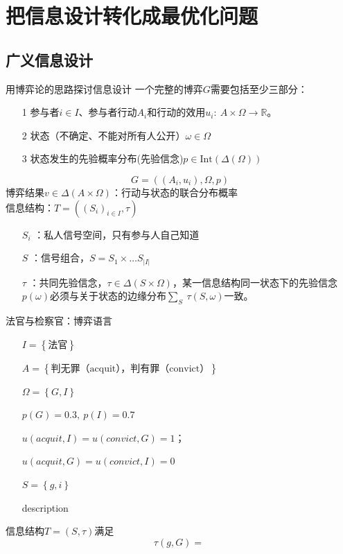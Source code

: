 \documentclass{beamer}
\begin{document}
\section{把信息设计转化成最优化问题}

\subsection{广义信息设计}

\begin{frame}{用博弈论的思路探讨信息设计}
	一个完整的博弈$G$需要包括至少三部分：
	\begin{itemize}
		\item[1] 参与者$i\in I$、参与者行动$A_{i}$和行动的效用$u_{i}: \ A\times\Omega\to\mathbb{R}$。
		\item[2] 状态（不确定、不能对所有人公开）$\omega\in\Omega$
		\item[3] 状态发生的先验概率分布(先验信念)$p\in \text{Int} \left(\Delta\left(\Omega\right)\right)$
	\end{itemize}
	$$G=\left(\left(A_{i},u_{i}\right),\Omega,p\right)$$
	博弈结果$v\in\Delta\left(A\times\Omega\right)$：行动与状态的联合分布概率\\
	信息结构：$T=\left(\left(S_{i}\right)_{i\in I},\tau\right)$
	\begin{itemize}
		\item[$S_{i}$] ：私人信号空间，只有参与人自己知道
		\item[$ S $] ：信号组合，$S=S_{1}\times\dots S_{|I|}$
		\item[$ \tau $] ：共同先验信念，$\tau \in \Delta\left(S\times\Omega\right)$，某一信息结构同一状态下的先验信念$p\left(\omega\right)$必须与关于状态的边缘分布$\sum_{S}\ \tau\left(S,\omega\right)$一致。
		
	\end{itemize}
\end{frame}

\begin{frame}{法官与检察官：博弈语言}
	\begin{itemize}
		\item[] $I=\left\lbrace \text{法官} \right\rbrace$
		\item[] $A=\left\lbrace \text{判无罪（acquit），判有罪（convict）} \right\rbrace$
		\item[] $\Omega=\left\lbrace G,I\right\rbrace$
		\item[] $p\left(G\right)=0.3, \ p\left(I\right)=0.7$
		\item[] $u\left( acquit,I\right) =u\left( convict,G\right)=1 \text{；} $
		\item[] $u\left( acquit,G\right) =u\left( convict,I\right)=0$
		\item[] $S=\left\lbrace g,i\right\rbrace$
		\item[] description
	\end{itemize}
	信息结构$T=\left(S,\tau\right)$满足
	$$\tau\left(g,G\right)=\ $$
\end{frame}
\end{document}
